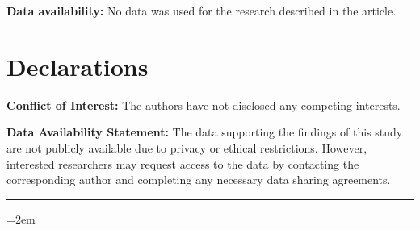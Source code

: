 \documentclass[12pt]{article}
\begin{document}
{\bf Data availability:} No data was used for the research described in the article.

\section{Declarations}
{\bf Conflict of Interest:} The authors have not disclosed any competing interests.

{\bf Data Availability Statement:}
The data supporting the findings of this study are not publicly available due to privacy or ethical restrictions. However, interested researchers may request access to the data by contacting the corresponding author and completing any necessary data sharing agreements.

\parskip=5pt
\noindent \rule[0pt]{25em}{1pt}

\parskip=10pt


\leftmargin=2em%

\end{document}
